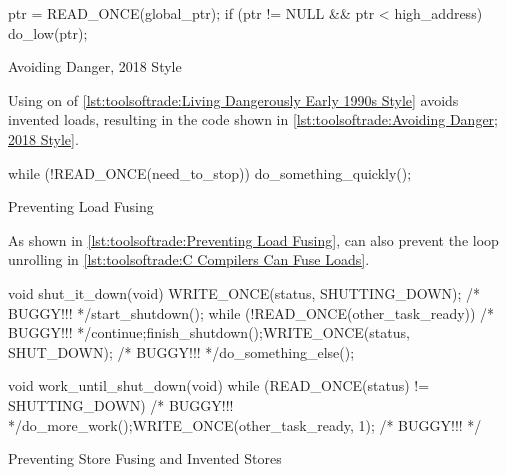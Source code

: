 \begin{listing}
\begin{fcvlabel}
\begin{VerbatimL}[commandchars=\\\{\}]
ptr = READ_ONCE(global_ptr);
if (ptr != NULL && ptr < high_address)
	do_low(ptr);
\end{VerbatimL}
\end{fcvlabel}
\caption{Avoiding Danger, 2018 Style}
\label{lst:toolsoftrade:Avoiding Danger; 2018 Style}
\end{listing}

Using  on
 of
\cref{lst:toolsoftrade:Living Dangerously Early 1990s Style}
avoids invented loads,
resulting in the code shown in
\cref{lst:toolsoftrade:Avoiding Danger; 2018 Style}.

\begin{listing}
\begin{fcvlabel}
\begin{VerbatimL}[commandchars=\\\{\}]
while (!READ_ONCE(need_to_stop))
	do_something_quickly();
\end{VerbatimL}
\end{fcvlabel}
\caption{Preventing Load Fusing}
\label{lst:toolsoftrade:Preventing Load Fusing}
\end{listing}

As shown in
\cref{lst:toolsoftrade:Preventing Load Fusing},
 can also prevent the loop unrolling in
\cref{lst:toolsoftrade:C Compilers Can Fuse Loads}.

\begin{listing}
\begin{fcvlabel}
\begin{VerbatimL}[commandchars=\\\[\]]
void shut_it_down(void)
{
	WRITE_ONCE(status, SHUTTING_DOWN); /* BUGGY!!! */\lnlbl[store:a]
	start_shutdown();
	while (!READ_ONCE(other_task_ready)) /* BUGGY!!! */\lnlbl[loop:b]
		continue;\lnlbl[loop:e]
	finish_shutdown();\lnlbl[finish]
	WRITE_ONCE(status, SHUT_DOWN); /* BUGGY!!! */\lnlbl[store:b]
	do_something_else();
}

void work_until_shut_down(void)
{
	while (READ_ONCE(status) != SHUTTING_DOWN) /* BUGGY!!! */
		do_more_work();
	WRITE_ONCE(other_task_ready, 1); /* BUGGY!!! */
}
\end{VerbatimL}
\end{fcvlabel}
\caption{Preventing Store Fusing and Invented Stores}
\label{lst:toolsoftrade:Preventing Store Fusing and Invented Stores}
\end{listing}

